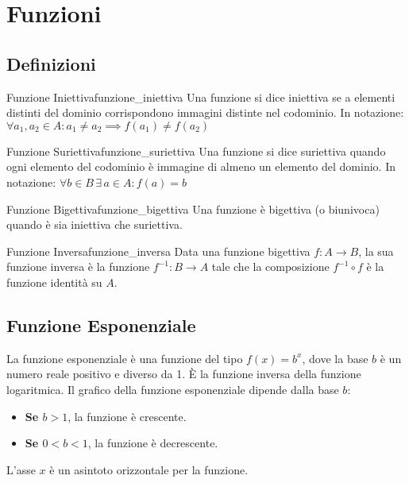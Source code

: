 \section{Funzioni}

\subsection{Definizioni}

\begin{definition}{Funzione Iniettiva}{funzione_iniettiva}
    Una funzione si dice iniettiva se a elementi distinti del dominio corrispondono immagini distinte nel codominio. In notazione: $ \forall a_1, a_2 \in A: a_1 \neq a_2 \implies f(a_1) \neq f(a_2)$
\end{definition}

\begin{definition}{Funzione Suriettiva}{funzione_suriettiva}
    Una funzione si dice suriettiva quando ogni elemento del codominio è immagine di almeno un elemento del dominio. In notazione: $ \forall b \in B \, \exists \, a \in A: f(a) = b $
\end{definition}

\begin{definition}{Funzione Bigettiva}{funzione_bigettiva}
    Una funzione è bigettiva (o biunivoca) quando è sia iniettiva che suriettiva.
\end{definition}

\begin{definition}{Funzione Inversa}{funzione_inversa}
    Data una funzione bigettiva $f: A \to B$, la sua funzione inversa è la funzione $f^{-1}: B \to A$ tale che la composizione $f^{-1} \circ f$ è la funzione identità su $A$.
\end{definition}

\subsection{Funzione Esponenziale}
La funzione esponenziale è una funzione del tipo $f(x) = b^x$, dove la base $b$ è un numero reale positivo e diverso da 1. È la funzione inversa della funzione logaritmica.
Il grafico della funzione esponenziale dipende dalla base $b$:
\begin{itemize}
    \item \textbf{Se $b > 1$}, la funzione è crescente.
    \item \textbf{Se $0 < b < 1$}, la funzione è decrescente.
\end{itemize}
L'asse $x$ è un asintoto orizzontale per la funzione.

